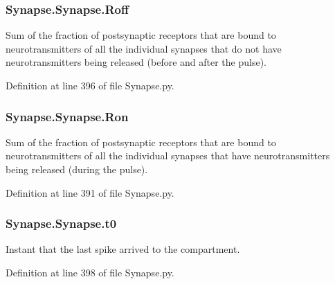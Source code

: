 \subsubsection[{\texorpdfstring{Roff}{Roff}}]{\setlength{\rightskip}{0pt plus 5cm}Synapse.\+Synapse.\+Roff}\hypertarget{class_synapse_1_1_synapse_ae67ffbbd23cd9c56f20bda9e8e040663}{}\label{class_synapse_1_1_synapse_ae67ffbbd23cd9c56f20bda9e8e040663}


Sum of the fraction of postsynaptic receptors that are bound to neurotransmitters of all the individual synapses that do not have neurotransmitters being released (before and after the pulse). 



Definition at line 396 of file Synapse.\+py.

\subsubsection[{\texorpdfstring{Ron}{Ron}}]{\setlength{\rightskip}{0pt plus 5cm}Synapse.\+Synapse.\+Ron}\hypertarget{class_synapse_1_1_synapse_ae759c51a7196995510fe3eb086050c76}{}\label{class_synapse_1_1_synapse_ae759c51a7196995510fe3eb086050c76}


Sum of the fraction of postsynaptic receptors that are bound to neurotransmitters of all the individual synapses that have neurotransmitters being released (during the pulse). 



Definition at line 391 of file Synapse.\+py.

\subsubsection[{\texorpdfstring{t0}{t0}}]{\setlength{\rightskip}{0pt plus 5cm}Synapse.\+Synapse.\+t0}\hypertarget{class_synapse_1_1_synapse_ad0adf1cb832bd7ce7918f2779171d7d7}{}\label{class_synapse_1_1_synapse_ad0adf1cb832bd7ce7918f2779171d7d7}


Instant that the last spike arrived to the compartment. 



Definition at line 398 of file Synapse.\+py.

